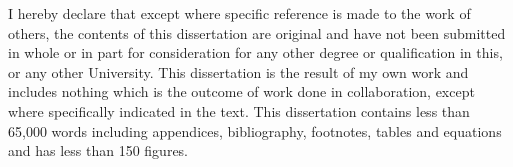 
\begin{declaration} %

I hereby declare that except where specific reference is made to the work of others, the contents of this dissertation are original and have not been submitted in whole or in part for consideration for any other degree or qualification in this, or any other University. This dissertation is the result of my own work and includes nothing which is the outcome of work done in collaboration, except where specifically indicated in the text. This dissertation contains less than 65,000 words including appendices, bibliography, footnotes, tables and equations and has less than 150 figures.





\end{declaration}

